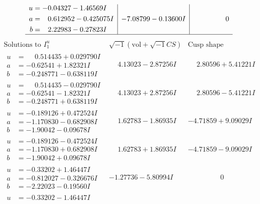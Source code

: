 \documentclass[1p]{elsarticle_modified}
\theoremstyle{definition}
\newcommand{\I}{\sqrt{-1}}
\begin{document}
$$\begin{array}{c|c|c}
\begin{aligned}
u &= -0.04327 - 1.46569 I \\
a &= \phantom{-}0.612952 - 0.425075 I \\
b &= \phantom{-}2.22983 - 0.27823 I\end{aligned}
 & -7.08799 - 0.13600 I & \phantom{-0.000000 } 0\\
 \hline 
 \end{array}$$\newpage$$\begin{array}{c|c|c}  
\text{Solutions to }I^u_{1}& \I (\text{vol} + \sqrt{-1}CS) & \text{Cusp shape}\\
 \hline 
\begin{aligned}
u &= \phantom{-}0.514435 + 0.029790 I \\
a &= -0.62541 + 1.82321 I \\
b &= -0.248771 - 0.638119 I\end{aligned}
 & \phantom{-}4.13023 - 2.87256 I & \phantom{-}2.80596 + 5.41221 I \\ \hline\begin{aligned}
u &= \phantom{-}0.514435 - 0.029790 I \\
a &= -0.62541 - 1.82321 I \\
b &= -0.248771 + 0.638119 I\end{aligned}
 & \phantom{-}4.13023 + 2.87256 I & \phantom{-}2.80596 - 5.41221 I \\ \hline\begin{aligned}
u &= -0.189126 + 0.472524 I \\
a &= -1.170830 - 0.682908 I \\
b &= -1.90042 - 0.09678 I\end{aligned}
 & \phantom{-}1.62783 - 1.86935 I & -4.71859 + 9.09029 I \\ \hline\begin{aligned}
u &= -0.189126 - 0.472524 I \\
a &= -1.170830 + 0.682908 I \\
b &= -1.90042 + 0.09678 I\end{aligned}
 & \phantom{-}1.62783 + 1.86935 I & -4.71859 - 9.09029 I \\ \hline\begin{aligned}
u &= -0.33202 + 1.46447 I \\
a &= -0.812027 - 0.326676 I \\
b &= -2.22023 - 0.19560 I\end{aligned}
 & -1.27736 - 5.80994 I & \phantom{-0.000000 } 0 \\ \hline\begin{aligned}
u &= -0.33202 - 1.46447 I \\

\end{aligned}
\end{array}$$
\end{document}
